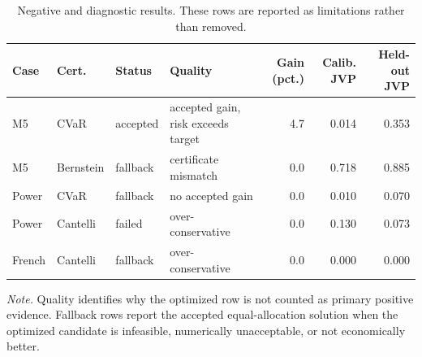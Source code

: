 \begin{table}[t]
\centering
\small
\caption{Negative and diagnostic results. These rows are reported as limitations rather than removed.}
\label{tab:limitations}
\begin{tabularx}{\linewidth}{lllXrrr}
\toprule
Case & Cert. & Status & Quality & Gain (pct.) & Calib. JVP & Held-out JVP \\
\midrule
M5 & CVaR & accepted & accepted gain, risk exceeds target & 4.7 & 0.014 & 0.353 \\
M5 & Bernstein & fallback & certificate mismatch & 0.0 & 0.718 & 0.885 \\
Power & CVaR & fallback & no accepted gain & 0.0 & 0.010 & 0.070 \\
Power & Cantelli & failed & over-conservative & 0.0 & 0.130 & 0.073 \\
French & Cantelli & fallback & over-conservative & 0.0 & 0.000 & 0.000 \\
\bottomrule
\end{tabularx}
\vspace{2pt}
\begin{minipage}{.98\linewidth}
\footnotesize \textit{Note.} Quality identifies why the optimized row is not counted as primary positive evidence. Fallback rows report the accepted equal-allocation solution when the optimized candidate is infeasible, numerically unacceptable, or not economically better.
\end{minipage}
\end{table}
